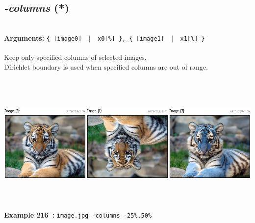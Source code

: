 \documentclass[a4paper,11pt,twoside]{book}
\begin{document}
\subsection{\emph{-columns} (*)}\vspace*{-0.5em}
~\\\textbf{Arguments: } 
{\small \texttt{\{ [image0] ~$|$~ x0[\%] \},\_\{ [image1] ~$|$~ x1[\%] \}}}\\~\\
Keep only specified columns of selected images.
~\\Dirichlet boundary is used when specified columns are out of range.
\begin{center}\includegraphics[keepaspectratio=true,height=7cm,width=\textwidth]{img/gmic_def216.jpg}\\
{\footnotesize \textbf{Example 216~:} \texttt{image.jpg -columns -25\%,50\%}}
\end{center}
\end{document}
